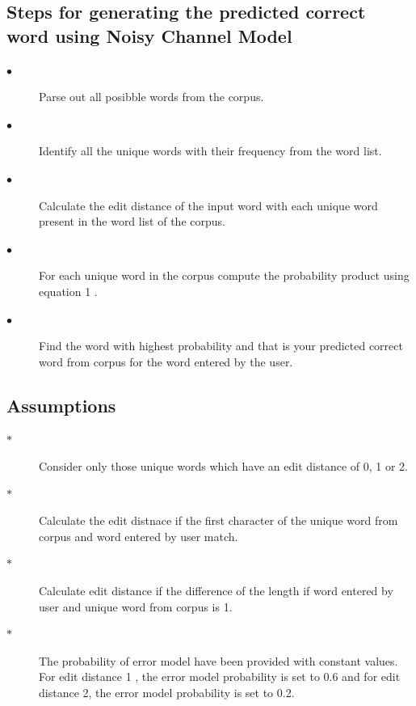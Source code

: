 \documentclass[12pt]{report}
\begin{document}
\subsection{Steps for generating the predicted correct word using Noisy Channel Model}
\begin{description}
\item[$\bullet$] Parse out all posibble words from the corpus.
\item[$\bullet$] Identify all the unique words with their frequency from the word list. 
\item[$\bullet$] Calculate the edit distance of the input word with each unique word present in the word list of the corpus.
\item[$\bullet$]For each unique word in the corpus compute the probability product using equation 1 . 
\item[$\bullet$] Find the word with highest probability and that is your predicted correct word from corpus for the word entered by the user.   
\end{description}
\subsection{Assumptions}
\begin{description}
\item[$\ast$]Consider only those unique words which have an edit distance of 0, 1 or 2.
\item[$\ast$]Calculate the edit distnace if the first character of the unique word from corpus and word entered by user match.
\item[$\ast$]Calculate edit distance if the difference of the length if word entered by user and unique word from corpus is 1.
\item[$\ast$]The probability of error model have been provided with constant values. For edit distance 1 , the error model probability is set to 0.6 and for edit distance 2, the error model probability is set to 0.2.
\end{description}
\end{document}
